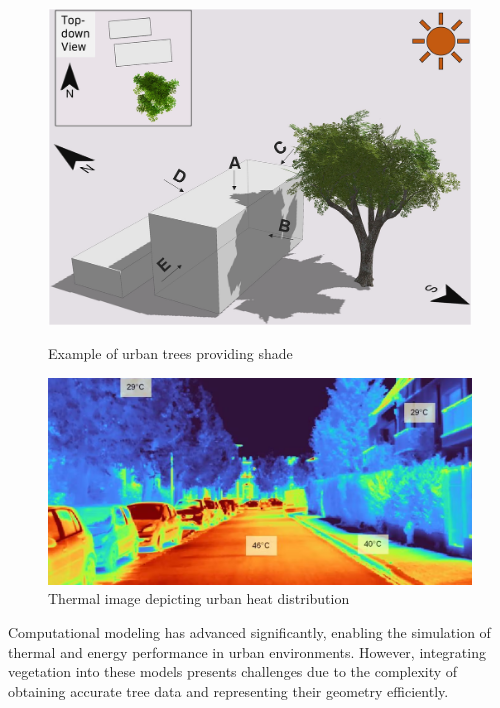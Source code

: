 \documentclass[12pt]{article}
\begin{document}
\begin{figure}[H]
    \centering
    \begin{minipage}{0.45\textwidth}
        \centering
        \includegraphics[width=\textwidth]{images/TreeShade.png}
        \caption{Example of urban trees providing shade \cite{img:TreeShade}}
    \end{minipage}\hfill
    \begin{minipage}{0.45\textwidth}
        \centering
        \includegraphics[width=\textwidth]{images/heat_street.png}
        \caption{Thermal image depicting urban heat distribution \cite{img:street_thermography}}
    \end{minipage}
\end{figure}

Computational modeling has advanced significantly, enabling the simulation of thermal 
and energy performance in urban environments. However, integrating vegetation into 
these models presents challenges due to the complexity of obtaining accurate tree data 
and representing their geometry efficiently\cite{AdTree}.
\end{document}
